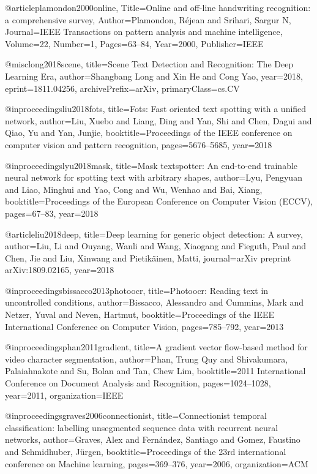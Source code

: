 @article{plamondon2000online,
	Title={Online and off-line handwriting recognition: a comprehensive survey},
	Author={Plamondon, R{\'e}jean and Srihari, Sargur N},
	Journal={IEEE Transactions on pattern analysis and machine intelligence},
	Volume={22},
	Number={1},
	Pages={63--84},
	Year={2000},
	Publisher={IEEE}
}

@misc{long2018scene,
    title={Scene Text Detection and Recognition: The Deep Learning Era},
    author={Shangbang Long and Xin He and Cong Yao},
    year={2018},
    eprint={1811.04256},
    archivePrefix={arXiv},
    primaryClass={cs.CV}
}

@inproceedings{liu2018fots,
  title={Fots: Fast oriented text spotting with a unified network},
  author={Liu, Xuebo and Liang, Ding and Yan, Shi and Chen, Dagui and Qiao, Yu and Yan, Junjie},
  booktitle={Proceedings of the IEEE conference on computer vision and pattern recognition},
  pages={5676--5685},
  year={2018}
}

@inproceedings{lyu2018mask,
  title={Mask textspotter: An end-to-end trainable neural network for spotting text with arbitrary shapes},
  author={Lyu, Pengyuan and Liao, Minghui and Yao, Cong and Wu, Wenhao and Bai, Xiang},
  booktitle={Proceedings of the European Conference on Computer Vision (ECCV)},
  pages={67--83},
  year={2018}
}

@article{liu2018deep,
  title={Deep learning for generic object detection: A survey},
  author={Liu, Li and Ouyang, Wanli and Wang, Xiaogang and Fieguth, Paul and Chen, Jie and Liu, Xinwang and Pietik{\"a}inen, Matti},
  journal={arXiv preprint arXiv:1809.02165},
  year={2018}
}

@inproceedings{bissacco2013photoocr,
  title={Photoocr: Reading text in uncontrolled conditions},
  author={Bissacco, Alessandro and Cummins, Mark and Netzer, Yuval and Neven, Hartmut},
  booktitle={Proceedings of the IEEE International Conference on Computer Vision},
  pages={785--792},
  year={2013}
}

@inproceedings{phan2011gradient,
  title={A gradient vector flow-based method for video character segmentation},
  author={Phan, Trung Quy and Shivakumara, Palaiahnakote and Su, Bolan and Tan, Chew Lim},
  booktitle={2011 International Conference on Document Analysis and Recognition},
  pages={1024--1028},
  year={2011},
  organization={IEEE}
}

@inproceedings{graves2006connectionist,
  title={Connectionist temporal classification: labelling unsegmented sequence data with recurrent neural networks},
  author={Graves, Alex and Fern{\'a}ndez, Santiago and Gomez, Faustino and Schmidhuber, J{\"u}rgen},
  booktitle={Proceedings of the 23rd international conference on Machine learning},
  pages={369--376},
  year={2006},
  organization={ACM}
}